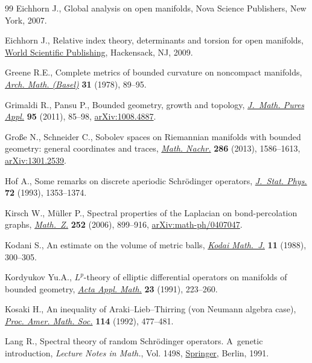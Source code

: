 \documentclass[pdftex]{sigma}
\numberwithin{equation}{section}
\begin{document}
\begin{thebibliography}{99}
Eichhorn J., Global analysis on open manifolds, Nova Science Publishers, New
 York, 2007.

Eichhorn J., Relative index theory, determinants and torsion for open
 manifolds, \href{https://doi.org/10.1142/9789812771452}{World Scientific Publishing}, Hackensack, NJ, 2009.

Greene R.E., Complete metrics of bounded curvature on noncompact manifolds,
 \href{https://doi.org/10.1007/BF01226419}{\textit{Arch. Math. (Basel)}} \textbf{31} (1978), 89--95.

Grimaldi R., Pansu P., Bounded geometry, growth and topology, \href{https://doi.org/10.1016/j.matpur.2010.10.005}{\textit{J.~Math.
 Pures Appl.}} \textbf{95} (2011), 85--98, \href{https://arxiv.org/abs/1008.4887}{arXiv:1008.4887}.

Gro{\ss}e N., Schneider C., Sobolev spaces on {R}iemannian manifolds with
 bounded geometry: general coordinates and traces, \href{https://doi.org/10.1002/mana.201300007}{\textit{Math. Nachr.}}
 \textbf{286} (2013), 1586--1613, \href{https://arxiv.org/abs/1301.2539}{arXiv:1301.2539}.

Hof A., Some remarks on discrete aperiodic {S}chr\"odinger operators,
 \href{https://doi.org/10.1007/BF01048190}{\textit{J.~Stat. Phys.}} \textbf{72} (1993), 1353--1374.

Kirsch W., M\"uller P., Spectral properties of the {L}aplacian on
 bond-percolation graphs, \href{https://doi.org/10.1007/s00209-005-0895-5}{\textit{Math.~Z.}} \textbf{252} (2006), 899--916,
 \href{https://arxiv.org/abs/math-ph/0407047}{arXiv:math-ph/0407047}.

Kodani S., An estimate on the volume of metric balls, \href{https://doi.org/10.2996/kmj/1138038881}{\textit{Kodai Math.~J.}}
 \textbf{11} (1988), 300--305.

Kordyukov Yu.A., {$L^p$}-theory of elliptic differential operators on manifolds
 of bounded geometry, \href{https://doi.org/10.1007/BF00047137}{\textit{Acta Appl. Math.}} \textbf{23} (1991), 223--260.

Kosaki H., An inequality of {A}raki--{L}ieb--{T}hirring (von {N}eumann algebra
 case), \href{https://doi.org/10.2307/2159671}{\textit{Proc. Amer. Math. Soc.}} \textbf{114} (1992), 477--481.

Lang R., Spectral theory of random {S}chr\"odinger operators. {A}~genetic
 introduction, \textit{Lecture Notes in Math.}, Vol. 1498, \href{https://doi.org/10.1007/BFb0093929}{Springer}, Berlin,
 1991.


\end{thebibliography}
\end{document}
